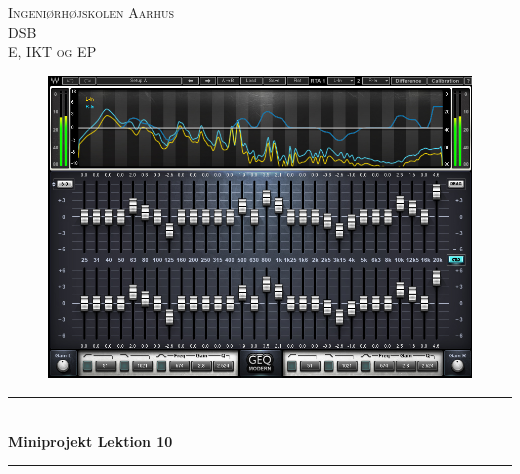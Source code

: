 \begin{titlepage}
		
		\newcommand{\HRule}{\rule{\linewidth}{0.5mm}} %
		
		\center %
		
		
		\textsc{\LARGE Ingeniørhøjskolen Aarhus}\\[1cm] %
		\textsc{\Large DSB}\\[0.5cm] %
		\textsc{\large E, IKT og EP}\\[0.5cm] %
		
		\begin{figure}[ht!]
			\centering
			\includegraphics[width=120mm]{figures/forside.jpg}
		\end{figure}
		
		
		\HRule \\[0.5cm]
		{ \huge \bfseries Miniprojekt Lektion 10}\\[0.4cm] %
		\HRule \\[0.5cm]
		
		

\end{titlepage}
